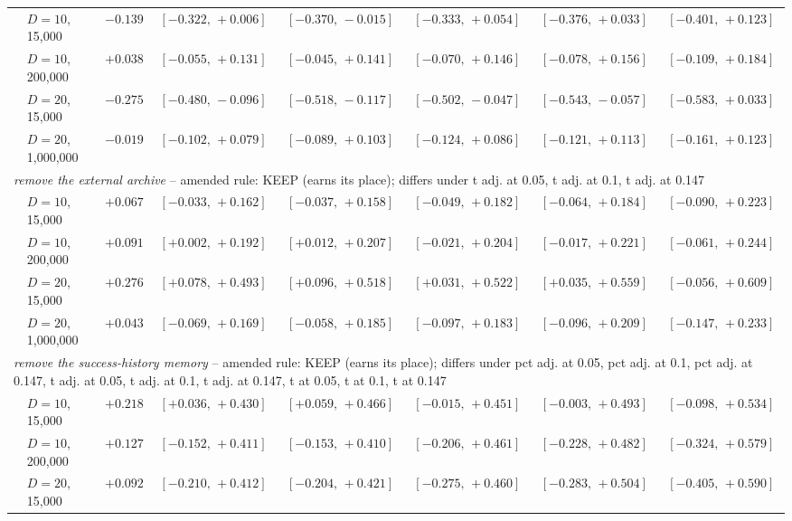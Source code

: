 \begin{table}[htbp]
{\begin{tabular}{llrccccc}
\quad & $D{=}10$, 15{,}000 & $-0.139$ & $[-0.322,\,+0.006]$ & $[-0.370,\,-0.015]$ & $[-0.333,\,+0.054]$ & $[-0.376,\,+0.033]$ & $[-0.401,\,+0.123]$ \\
\quad & $D{=}10$, 200{,}000 & $+0.038$ & $[-0.055,\,+0.131]$ & $[-0.045,\,+0.141]$ & $[-0.070,\,+0.146]$ & $[-0.078,\,+0.156]$ & $[-0.109,\,+0.184]$ \\
\quad & $D{=}20$, 15{,}000 & $-0.275$ & $[-0.480,\,-0.096]$ & $[-0.518,\,-0.117]$ & $[-0.502,\,-0.047]$ & $[-0.543,\,-0.057]$ & $[-0.583,\,+0.033]$ \\
\quad & $D{=}20$, 1{,}000{,}000 & $-0.019$ & $[-0.102,\,+0.079]$ & $[-0.089,\,+0.103]$ & $[-0.124,\,+0.086]$ & $[-0.121,\,+0.113]$ & $[-0.161,\,+0.123]$ \\
\multicolumn{8}{l}{\emph{remove the external archive} -- amended rule: KEEP (earns its place); differs under t adj. at 0.05, t adj. at 0.1, t adj. at 0.147} \\
\quad & $D{=}10$, 15{,}000 & $+0.067$ & $[-0.033,\,+0.162]$ & $[-0.037,\,+0.158]$ & $[-0.049,\,+0.182]$ & $[-0.064,\,+0.184]$ & $[-0.090,\,+0.223]$ \\
\quad & $D{=}10$, 200{,}000 & $+0.091$ & $[+0.002,\,+0.192]$ & $[+0.012,\,+0.207]$ & $[-0.021,\,+0.204]$ & $[-0.017,\,+0.221]$ & $[-0.061,\,+0.244]$ \\
\quad & $D{=}20$, 15{,}000 & $+0.276$ & $[+0.078,\,+0.493]$ & $[+0.096,\,+0.518]$ & $[+0.031,\,+0.522]$ & $[+0.035,\,+0.559]$ & $[-0.056,\,+0.609]$ \\
\quad & $D{=}20$, 1{,}000{,}000 & $+0.043$ & $[-0.069,\,+0.169]$ & $[-0.058,\,+0.185]$ & $[-0.097,\,+0.183]$ & $[-0.096,\,+0.209]$ & $[-0.147,\,+0.233]$ \\
\multicolumn{8}{l}{\emph{remove the success-history memory} -- amended rule: KEEP (earns its place); differs under pct adj. at 0.05, pct adj. at 0.1, pct adj. at 0.147, t adj. at 0.05, t adj. at 0.1, t adj. at 0.147, t at 0.05, t at 0.1, t at 0.147} \\
\quad & $D{=}10$, 15{,}000 & $+0.218$ & $[+0.036,\,+0.430]$ & $[+0.059,\,+0.466]$ & $[-0.015,\,+0.451]$ & $[-0.003,\,+0.493]$ & $[-0.098,\,+0.534]$ \\
\quad & $D{=}10$, 200{,}000 & $+0.127$ & $[-0.152,\,+0.411]$ & $[-0.153,\,+0.410]$ & $[-0.206,\,+0.461]$ & $[-0.228,\,+0.482]$ & $[-0.324,\,+0.579]$ \\
\quad & $D{=}20$, 15{,}000 & $+0.092$ & $[-0.210,\,+0.412]$ & $[-0.204,\,+0.421]$ & $[-0.275,\,+0.460]$ & $[-0.283,\,+0.504]$ & $[-0.405,\,+0.590]$ \\

\end{tabular}}
\end{table}
